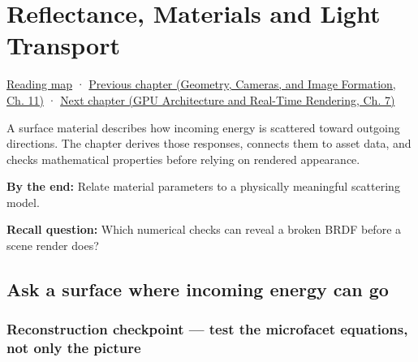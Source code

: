 \chapter{Reflectance, Materials and Light Transport}\label{03-visual-computing-i-ch005-reflectance-materials-and-light-transport}\hypertarget{03-visual-computing-i-ch005}{}\label{stagechapter:03-visual-computing-i-ch005}

\hypertarget{03-visual-computing-i-ch005-reflectance-materials-and-light-transport}{}

\hyperref[volume-reading-map]{Reading map} · \href{../03-Geometry-Cameras-and-Image-Formation/main.pdf\#nameddest=03-visual-computing-i-ch004-sampling-filtering-and-reconstruction}{Previous chapter (Geometry, Cameras, and Image Formation, Ch. 11)} · \href{../06-GPU-Architecture-and-Real-Time-Rendering/main.pdf\#nameddest=03-visual-computing-i-ch006-from-material-data-to-gpu-bindings}{Next chapter (GPU Architecture and Real-Time Rendering, Ch. 7)}

A surface material describes how incoming energy is scattered toward outgoing directions. The chapter derives those responses, connects them to asset data, and checks mathematical properties before relying on rendered appearance.

\textbf{By the end:} Relate material parameters to a physically meaningful scattering model.

\textbf{Recall question:} Which numerical checks can reveal a broken BRDF before a scene render does?

\section{Ask a surface where incoming energy can go}\label{03-visual-computing-i-ch005-ask-a-surface-where-incoming-energy-can-go}

\hypertarget{03-visual-computing-i-ch005-ask-a-surface-where-incoming-energy-can-go}{}

\subsection{Reconstruction checkpoint --- test the microfacet equations, not only the picture}\label{03-visual-computing-i-ch005-reconstruction-checkpoint-test-the-microfacet-equations-not-only-the-picture}

\hypertarget{03-visual-computing-i-ch005-reconstruction-checkpoint-test-the-microfacet-equations-not-only-the-picture}{}


